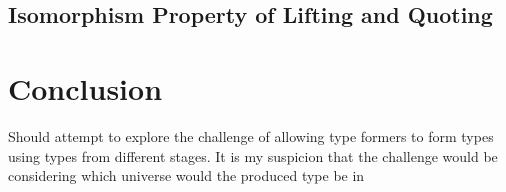 \documentclass{article}
\begin{document}
\subsection{Isomorphism Property of Lifting and Quoting}





\section{Conclusion}

Should attempt to explore the challenge of allowing type formers to form types using types from different stages. It is my suspicion that the challenge would be considering which universe would the produced type be in




\printbibliography
\end{document}
